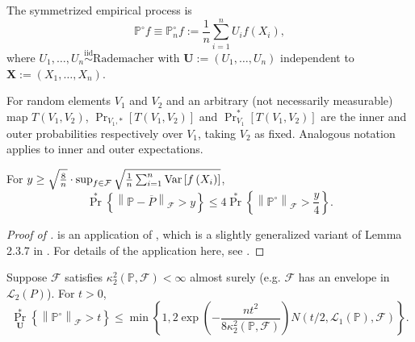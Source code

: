 The symmetrized empirical process is
\begin{equation}
  \mathbb{P}^{\circ} f \equiv \mathbb{P}^{\circ}_{n} f := \frac{1}{n} \sum_{i =
  1}^{n} U_{i} f \left( X_{i} \right),
\end{equation}
where \(U_{1}, \dots, U_{n} \overset{\mathrm{iid}}{\sim} \text{Rademacher}\)
with \(\mathbf{U} := \left( U_{1}, \dots, U_{n} \right)\) independent to
\(\mathbf{X} := \left( X_{1}, \dots, X_{n} \right)\).

\begin{remark}
For random elements \(V_{1}\) and \(V_{2}\) and an arbitrary
(not necessarily measurable) map \(T \left( V_{1}, V_{2} \right)\),
\(\Pr_{V_{1}, \ast} \left[ T \left( V_{1}, V_{2} \right) \right]\) and
\(\Pr_{V_{1}}^{\ast} \left[ T \left( V_{1}, V_{2} \right) \right]\) are the
inner and outer probabilities respectively over \(V_{1}\), taking \(V_{2}\) as
fixed.
Analogous notation applies to inner and outer expectations.
\end{remark}

\begin{lemma}
\label{lem--ep-norm-sym-bound}
For \(y \geq \sqrt{\frac{8}{n}} \cdot \sup_{f \in \mathcal{F}} \sqrt{\frac{1}{n}
\sum_{i =
1}^{n} \mathrm{Var} \left[ f \left( X_{i} \right) \right]}\),
\begin{equation}
  \Pr^{\ast} \left\{ \left\| \mathbb{P} - \overline{P} \right\|_{\mathcal{F}} >
  y \right\} \leq 4 \Pr^{\ast} \left\{ \left\| \mathbb{P}^{\circ}
  \right\|_{\mathcal{F}} > \frac{y}{4} \right\}.
  \label{eqn--ep-norm-sym-bound}
\end{equation}
\end{lemma}

\begin{proof}[Proof of ]
 is an application of , which is
a slightly generalized variant of Lemma 2.3.7 in
\citet[p. 176]{2023vandervaartWeakConvergenceEmpirical}.
For details of the application here, see
.
\end{proof}

\begin{lemma}
\label{lem--ep-sym-unif-hoeffding-cond}
Suppose \(\mathcal{F}\) satisfies \(\kappa_{2}^{2} \left( \mathbb{P},
\mathcal{F} \right) < \infty\) almost surely (e.g. \(\mathcal{F}\) has an
envelope in \(\mathscr{L}_{2} (P)\)).
For \(t > 0\),
\begin{equation}
  \Pr_{\mathbf{U}}^{\ast} \left\{ \left\| \mathbb{P}^{\circ}
  \right\|_{\mathcal{F}} > t \right\} \leq \min \left\{ 1, 2 \exp \left( -
  \frac{n t^{2}}{8 \kappa_{2}^{2} (\mathbb{P}, \mathcal{F})} \right) N \left( t
  / 2, \mathscr{L}_{1} (\mathbb{P}), \mathcal{F} \right) \right\}.
  \label{eqn--ep-sym-unif-hoeffding-cond}
\end{equation}
\end{lemma}

